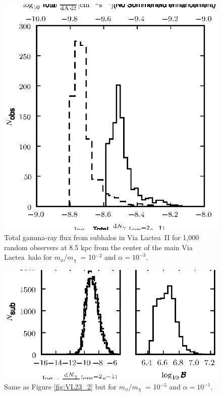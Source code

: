 \documentclass[aps,prd,twocolumn,amsmath,amssymb,floatfix,nofootinbib,10pt]{revtex4}
\newcommand{\VL}{Via Lactea}
\newcommand{\mdm}{\ensuremath{m_{\chi}}}
\newcommand{\mv}{\ensuremath{m_{\phi}}}
\begin{document}
\begin{figure}
\centering
\includegraphics{hist_-2_-3_10_3.eps}
\caption{Total gamma-ray flux from subhalos in \VL\ II for 1,000 random
observers at 8.5 kpc from the center of the main \VL\ halo for
\mv/\mdm\ = 10$^{-2}$ and $\alpha = 10^{-3}$.}%
\label{fig:VL23_3}%
\end{figure}



\begin{figure}
\centering
\includegraphics{hist_-5_-1_10_2.eps}
\caption{Same as Figure \ref{fig:VL23_2} but for \mv/\mdm\ = 10$^{-5}$
and $\alpha = 10^{-1}$.}%
\label{fig:VL51_1}%
\end{figure}
\end{document}
